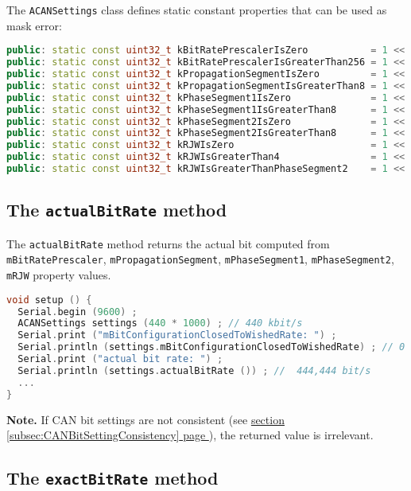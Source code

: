 \documentclass[9pt, a4paper, obeyspaces, openany]{extarticle}
\newcommand \subsectionLabel[2]{\subsection{#1}\label{subsec:#2}}
\newcommand\refSubsectionPage[1]{\hyperref[subsec:#1]{section \ref*{subsec:#1} page \pageref{subsec:#1}}}
\begin{document}
The \texttt{ACANSettings} class defines static constant properties that can be used as mask error:
{ \small\begin{lstlisting}[language=c++]
public: static const uint32_t kBitRatePrescalerIsZero           = 1 <<  0 ;
public: static const uint32_t kBitRatePrescalerIsGreaterThan256 = 1 <<  1 ;
public: static const uint32_t kPropagationSegmentIsZero         = 1 <<  2 ;
public: static const uint32_t kPropagationSegmentIsGreaterThan8 = 1 <<  3 ;
public: static const uint32_t kPhaseSegment1IsZero              = 1 <<  4 ;
public: static const uint32_t kPhaseSegment1IsGreaterThan8      = 1 <<  5 ;
public: static const uint32_t kPhaseSegment2IsZero              = 1 <<  6 ;
public: static const uint32_t kPhaseSegment2IsGreaterThan8      = 1 <<  7 ;
public: static const uint32_t kRJWIsZero                        = 1 <<  8 ;
public: static const uint32_t kRJWIsGreaterThan4                = 1 <<  9 ;
public: static const uint32_t kRJWIsGreaterThanPhaseSegment2    = 1 << 10 ;
\end{lstlisting}}









\subsectionLabel{The \texttt{actualBitRate} method}{actualBitRate}


The \texttt{actualBitRate} method returns the actual bit computed from \texttt{mBitRatePrescaler}, \texttt{mPropagationSegment}, \texttt{mPhaseSegment1}, \texttt{mPhaseSegment2}, \texttt{mRJW} property values.

{ \small\begin{lstlisting}[language=c++]
void setup () {
  Serial.begin (9600) ;
  ACANSettings settings (440 * 1000) ; // 440 kbit/s 
  Serial.print ("mBitConfigurationClosedToWishedRate: ") ;
  Serial.println (settings.mBitConfigurationClosedToWishedRate) ; // 0 (--> is false)
  Serial.print ("actual bit rate: ") ;
  Serial.println (settings.actualBitRate ()) ; //  444,444 bit/s
  ...
}
\end{lstlisting}}

{\bf Note. } If CAN bit settings are not consistent (see \refSubsectionPage{CANBitSettingConsistency}), the returned value is irrelevant.











\subsectionLabel{The \texttt{exactBitRate} method}{exactBitRate}
\end{document}

